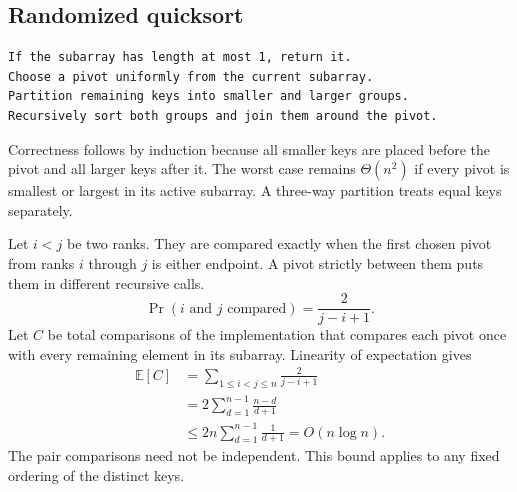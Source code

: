 \documentclass[12pt,a4paper]{article}
\begin{document}
\subsection{Randomized quicksort}
\begin{tcolorbox}[formulabox, title={Random-pivot quicksort for distinct keys}]
\begin{verbatim}
If the subarray has length at most 1, return it.
Choose a pivot uniformly from the current subarray.
Partition remaining keys into smaller and larger groups.
Recursively sort both groups and join them around the pivot.
\end{verbatim}
\end{tcolorbox}

Correctness follows by induction because all smaller keys are placed before the pivot and all larger keys after it. The worst case remains $\Theta(n^2)$ if every pivot is smallest or largest in its active subarray. A three-way partition treats equal keys separately.
\begin{tcolorbox}[examplebox, title={Expected comparison count using indicator variables}]
Let $i<j$ be two ranks. They are compared exactly when the first chosen pivot from ranks $i$ through $j$ is either endpoint. A pivot strictly between them puts them in different recursive calls.
\[
\Pr(\text{$i$ and $j$ compared})=\frac{2}{j-i+1}.
\]
Let $C$ be total comparisons of the implementation that compares each pivot once with every remaining element in its subarray. Linearity of expectation gives
\begin{align*}
\mathbb{E}[C]
 &= \sum_{1\le i<j\le n}\frac{2}{j-i+1}\\
 &=2\sum_{d=1}^{n-1}\frac{n-d}{d+1}\\
 &\le 2n\sum_{d=1}^{n-1}\frac{1}{d+1}
  = O(n\log n).
\end{align*}
The pair comparisons need not be independent. This bound applies to any fixed ordering of the distinct keys.
\end{tcolorbox}
\end{document}
